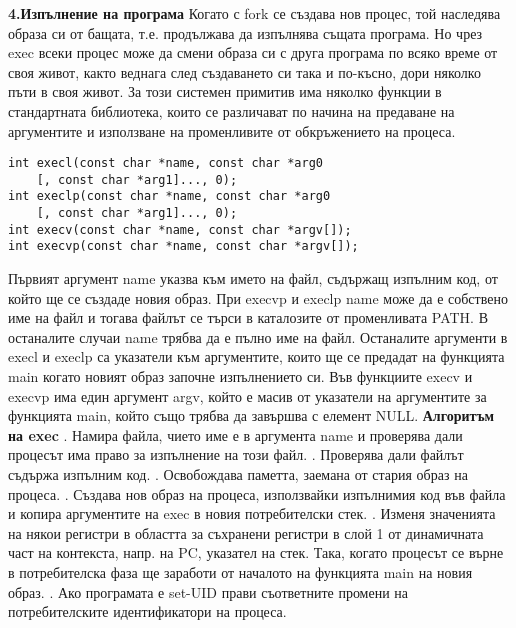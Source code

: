 \documentclass{article}
\begin{document}
\textbf{4.Изпълнение на програма} \newline
Когато с fork се създава нов процес, той наследява образа си от бащата, т.е. продължава да изпълнява същата програма. Но чрез
exec всеки процес може да смени образа си с друга програма по всяко време от своя живот, както веднага след създаването си така и
по-късно, дори няколко пъти в своя живот. За този системен примитив има няколко функции в стандартната библиотека, които се
различават по начина на предаване на аргументите и използване на променливите от обкръжението на процеса.
\begin{lstlisting}[style=CStyle]
int execl(const char *name, const char *arg0
    [, const char *arg1]..., 0);
int execlp(const char *name, const char *arg0
    [, const char *arg1]..., 0);
int execv(const char *name, const char *argv[]);
int execvp(const char *name, const char *argv[]);
\end{lstlisting}
Първият аргумент name указва към името на файл, съдържащ изпълним код, от който ще се създаде новия образ. При execvp и execlp
name може да е собствено име на файл и тогава файлът се търси в каталозите от променливата PATH. В останалите случаи name трябва
да е пълно име на файл. Останалите аргументи в execl и execlp са указатели към аргументите, които ще се предадат на функцията
main когато новият образ започне изпълнението си. Във функциите execv и execvp има един аргумент argv, който е масив от указатели
на аргументите за функцията main, който също трябва да завършва с елемент NULL. \newline
\textbf{Алгоритъм на exec} \newline{}. Намира файла, чието име е в аргумента name и проверява дали процесът има право за изпълнение на този файл. . Проверява дали файлът съдържа изпълним код. . Освобождава паметта, заемана от стария образ на процеса. . Създава нов образ на процеса, използвайки изпълнимия код във файла и копира аргументите на exec в новия потребителски стек. . Изменя значенията на някои регистри в областта за съхранени регистри в слой 1 от динамичната част на контекста, напр. на PC,
указател на стек. Така, когато процесът се върне в потребителска фаза ще заработи от началото на функцията main на новия образ. . Ако програмата е set-UID прави съответните промени на потребителските идентификатори на процеса. \newline
\end{document}
